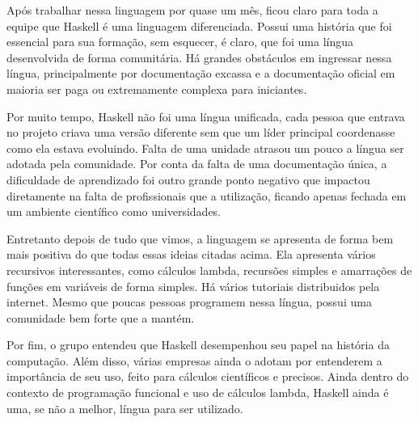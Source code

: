 \documentclass[
  12pt,				         %
  oneside,			       %
  a4paper,			       %
  english,		       	 %
  brazil,			      	 %
]{abntex2}
\begin{document}
    Após trabalhar nessa linguagem por quase um mês, ficou claro para toda a equipe que Haskell é uma linguagem diferenciada. Possui
    uma história que foi essencial para sua formação, sem esquecer, é claro, que foi uma língua desenvolvida de forma comunitária.
    Há grandes obstáculos em ingressar nessa língua, principalmente por documentação excassa e a documentação oficial em maioria ser
    paga ou extremamente complexa para iniciantes. 
    
    Por muito tempo, Haskell não foi uma língua unificada, cada pessoa que entrava no projeto criava uma versão diferente sem que um líder
    principal coordenasse como ela estava evoluindo. Falta de uma unidade atrasou um pouco a língua ser adotada pela comunidade.
    Por conta da falta de uma documentação única, a dificuldade de aprendizado foi outro grande ponto negativo que impactou diretamente
    na falta de profissionais que a utilização, ficando apenas fechada em um ambiente científico como universidades.

    Entretanto depois de tudo que vimos, a linguagem se apresenta de forma bem mais positiva do que todas essas ideias
    citadas acima. Ela apresenta vários recursivos interessantes, como cálculos lambda, recursões simples e amarrações de funções
    em variáveis de forma simples. Há vários tutoriais distribuidos pela internet. Mesmo que
    poucas pessoas programem nessa língua, possui uma comunidade bem forte que a mantém.

    Por fim, o grupo entendeu que Haskell desempenhou seu papel na história da computação. Além disso,
    várias empresas ainda o adotam por entenderem a importância de seu uso, feito para cálculos científicos e precisos.
    Ainda dentro do contexto de programação funcional e uso de cálculos lambda, Haskell ainda é uma, se não a melhor,
    língua para ser utilizado.

    \newpage

    \postextual
\end{document}
